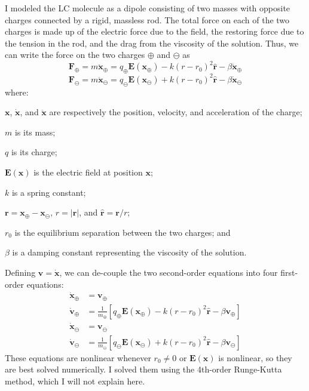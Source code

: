 \documentclass[twocolumn,aps,prl]{revtex4-1} %
\begin{document}
I modeled the LC molecule as a dipole consisting of two masses with opposite charges connected by a rigid, massless rod.  The total force on each of the two charges is made up of the electric force due to the field, the restoring force due to the tension in the rod, and the drag from the viscosity of the solution.  Thus, we can write the force on the two charges $\oplus$ and $\ominus$ as
$$ \mathbf{F}_\oplus = m\ddot{\mathbf{x}}_\oplus = q_\oplus\mathbf{E}(\mathbf{x}_\oplus) - k(r-r_0)^2\hat{\mathbf{r}} - \beta \dot{\mathbf{x}}_\oplus $$
$$ \mathbf{F}_\ominus = m\ddot{\mathbf{x}}_\ominus = q_\ominus\mathbf{E}(\mathbf{x}_\ominus) + k(r-r_0)^2\hat{\mathbf{r}} - \beta \dot{\mathbf{x}}_\ominus $$
\noindent where: 
\begin{list}{}{}
\item $\mathbf{x}$, $\dot{\mathbf{x}}$, and $\ddot{\mathbf{x}}$ are respectively the position, velocity, and acceleration of the charge;
\item $m$ is its mass;
\item $q$ is its charge;
\item $\mathbf{E}(\mathbf{x})$ is the electric field at position $\mathbf{x}$;
\item $k$ is a spring constant;
\item $\mathbf{r} = \mathbf{x}_\oplus - \mathbf{x}_\ominus$, $r = |\mathbf{r}|$, and $\hat{\mathbf{r}} = \mathbf{r}/r$; 
\item $r_0$ is the equilibrium separation between the two charges; and
\item $\beta$ is a damping constant representing the viscosity of the solution.
\end{list}
Defining $\mathbf{v} = \dot{\mathbf{x}}$, we can de-couple the two second-order equations into four first-order equations:
\begin{align*}
	\dot{\mathbf{x}}_\oplus &= \mathbf{v}_\oplus \\
	\dot{\mathbf{v}}_\oplus &= \frac{1}{m_\oplus}\left[q_\oplus\mathbf{E}(\mathbf{x}_\oplus) - k(r-r_0)^2\hat{\mathbf{r}} - \beta \mathbf{v}_\oplus\right] \\
	\dot{\mathbf{x}}_\ominus &= \mathbf{v}_\ominus \\
	\dot{\mathbf{v}}_\ominus &= \frac{1}{m_\ominus}\left[q_\ominus\mathbf{E}(\mathbf{x}_\ominus) + k(r-r_0)^2\hat{\mathbf{r}} - \beta \mathbf{v}_\ominus\right]
\end{align*}
These equations are nonlinear whenever $r_0 \neq 0$ or $\mathbf{E}(\mathbf{x})$ is nonlinear, so they are best solved numerically.  I solved them using the 4th-order Runge-Kutta method, which I will not explain here.
\end{document}
